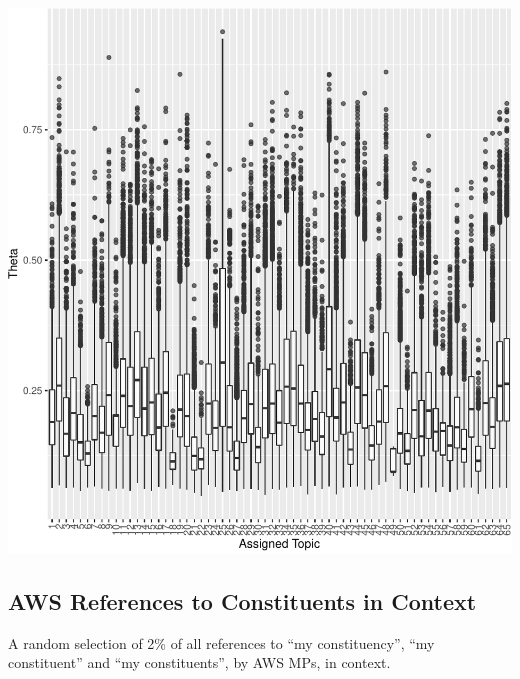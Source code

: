 \documentclass[]{article}
\let\origfigure\figure
\let\endorigfigure\endfigure
\renewenvironment{figure}[1][2] {
    \expandafter\origfigure\expandafter[H]
} {
    \endorigfigure
}
\begin{document}
\begin{figure}
\centering
\includegraphics{methodology_files/figure-latex/theta-boxplot-1.pdf}
\caption{\label{k0-theta-boxplot}Theta Values in Topic Assignment}
\end{figure}

\hypertarget{aws-references-to-constituents-in-context}{%
\subsection{AWS References to Constituents in
Context}\label{aws-references-to-constituents-in-context}}

A random selection of 2\% of all references to ``my constituency'', ``my
constituent'' and ``my constituents'', by AWS MPs, in context.
\end{document}
